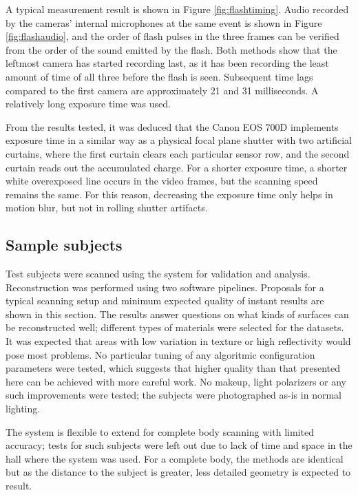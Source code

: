 A typical measurement result is shown in Figure \ref{fig:flashtiming}.
Audio recorded by the cameras' internal microphones at the same event is shown in Figure \ref{fig:flashaudio}, and the order of flash pulses in the three frames can be verified from the order of the sound emitted by the flash.
Both methods show that the leftmost camera has started recording last, as it has been recording the least amount of time of all three before the flash is seen.
Subsequent time lags compared to the first camera are approximately 21 and 31 milliseconds.
A relatively long exposure time was used.

From the results tested, it was deduced that the Canon EOS 700D implements exposure time in a similar way as a physical focal plane shutter with two artificial curtains, where the first curtain clears each particular sensor row, and the second curtain reads out the accumulated charge.
For a shorter exposure time, a shorter white overexposed line occurs in the video frames, but the scanning speed remains the same.
For this reason, decreasing the exposure time only helps in motion blur, but not in rolling shutter artifacts.

\subsection{Sample subjects} \label{sec:samplesubjects}


Test subjects were scanned using the system for validation and analysis.
Reconstruction was performed using two software pipelines.
Proposals for a typical scanning setup and minimum expected quality of instant results are shown in this section.
The results answer questions on what kinds of surfaces can be reconstructed well; different types of materials were selected for the datasets.
It was expected that areas with low variation in texture or high reflectivity would pose most problems.
No particular tuning of any algoritmic configuration parameters were tested, which suggests that higher quality than that presented here can be achieved with more careful work.
No makeup, light polarizers or any such improvements were tested; the subjects were photographed as-is in normal lighting.

The system is flexible to extend for complete body scanning with limited accuracy; tests for such subjects were left out due to lack of time and space in the hall where the system was used.
For a complete body, the methods are identical but as the distance to the subject is greater, less detailed geometry is expected to result.


